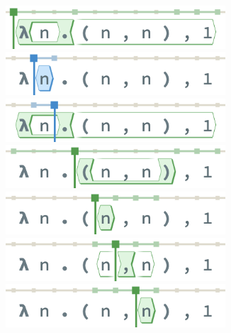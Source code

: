 \begin{figure}
  \centering

   \begin{subfigure}[c]{0.49\columnwidth}
      \centering
      \includegraphics[width=0.9\textwidth]{img/pan-terms-0.png}
      \includegraphics[width=0.9\textwidth]{img/pan-terms-1.png}
      \includegraphics[width=0.9\textwidth]{img/pan-terms-2.png}
      \includegraphics[width=0.9\textwidth]{img/pan-terms-3.png}
      \includegraphics[width=0.9\textwidth]{img/pan-terms-4.png}
      \includegraphics[width=0.9\textwidth]{img/pan-terms-5.png}
      \includegraphics[width=0.9\textwidth]{img/pan-terms-6.png}

\end{subfigure}
\end{figure}
